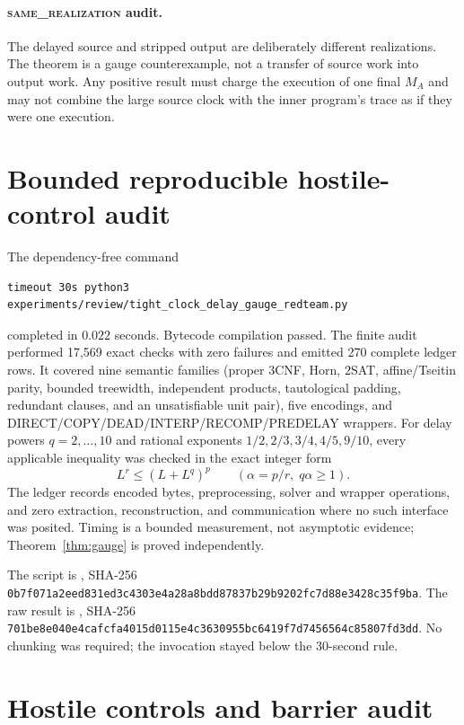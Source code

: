 \documentclass[11pt]{article}
\newcommand{\same}{\textsc{same\_realization}}
\begin{document}
\paragraph{\same{} audit.}
The delayed source and stripped output are deliberately different
realizations.  The theorem is a gauge counterexample, not a transfer of
source work into output work.  Any positive result must charge the execution
of one final $M_A$ and may not combine the large source clock with the inner
program's trace as if they were one execution.

\section{Bounded reproducible hostile-control audit}

The dependency-free command
\begin{verbatim}
timeout 30s python3 experiments/review/tight_clock_delay_gauge_redteam.py
\end{verbatim}
completed in $0.022$ seconds.  Bytecode compilation passed.  The finite audit
performed 17,569 exact checks with zero failures and emitted 270 complete
ledger rows.  It covered nine semantic families (proper $3$CNF, Horn, $2$SAT,
affine/Tseitin parity, bounded treewidth, independent products, tautological
padding, redundant clauses, and an unsatisfiable unit pair), five encodings,
and DIRECT/COPY/DEAD/INTERP/RECOMP/PREDELAY wrappers.  For delay powers
$q=2,\ldots,10$ and rational exponents
$1/2,2/3,3/4,4/5,9/10$, every applicable inequality was checked in the exact
integer form
\[
             L^r\le (L+L^q)^p\qquad(\alpha=p/r,\;q\alpha\ge1).
\]
The ledger records encoded bytes, preprocessing, solver and wrapper
operations, and zero extraction, reconstruction, and communication where no
such interface was posited.  Timing is a bounded measurement, not asymptotic
evidence; Theorem~\ref{thm:gauge} is proved independently.

The script is
, SHA-256
\nolinkurl{0b7f071a2eed831ed3c4303e4a28a8bdd87837b29b9202fc7d88e3428c35f9ba}.
The raw result is
, SHA-256
\nolinkurl{701be8e040e4cafcfa4015d0115e4c3630955bc6419f7d7456564c85807fd3dd}.
No chunking was required; the invocation stayed below the 30-second rule.

\section{Hostile controls and barrier audit}
\end{document}
